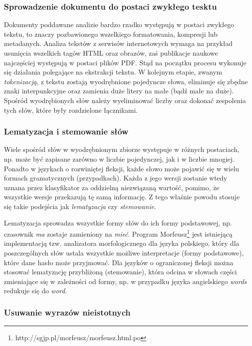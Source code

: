 \documentclass{pracamgr}
\begin{document}
\subsubsection{Sprowadzenie dokumentu do postaci zwykłego tesktu}

Dokumenty poddawane analizie bardzo rzadko występują w postaci zwykłego tekstu, to znaczy pozbawionego wszelkiego formatowania, kompresji lub metadanych. Analiza tekstów z serwisów internetowych wymaga na przykład usunięcia wszelkich tagów HTML oraz obrazów, zaś publikacje naukowe najczęściej występują w postaci plików PDF. Stąd na początku procesu wykonuje się działania polegające na ekstrakcji tekstu. W kolejnym etapie, zwanym \textit{tokenizacją}, z tekstu zostają wyodrębnione pojedyncze słowa, eliminuje się zbędne znaki interpunkcyjne oraz zamienia duże litery na małe (bądź małe na duże). Spośród wyodrębionych słów należy wyeliminować liczby oraz dokonać zespolenia tych słów, które były rozdzielone łącznikami.

\subsubsection{Lematyzacja i stemowanie słów}

Wiele spośród słów w wyodrębnionym zbiorze występuje w różnych postaciach, np. może być zapisane zarówno w liczbie pojedynczej, jak i w liczbie mnogiej. Ponadto w językach o rozwiniętej fleksji, każde słowo może pojawić się w wielu formach gramatycznych (przypadkach). Każda z jego wersji zostanie wtedy uznana przez klasyfikator za oddzielną niezwiązaną wartość, pomimo, że wszystkie wersje przekazują tę samą informację. Z tego właśnie powodu stosuje się takie podejścia jak \textit{lematyzacja} czy \textit{stemowanie}.

Lematyzacja sprowadza wszystkie formy słów do ich formy podstawowej, np. czasownik \textit{ma} zostaje zamieniony na \textit{mieć}. Program Morfeusz\footnote{http://sgjp.pl/morfeusz/morfeusz.html.po} jest istniejącą implementacją tzw. analizatora morfologicznego dla języka polskiego, który dla poszczególnych słów ustala wszystkie możliwe interpretacje (formy podstawowe), które dane hasło może przyjmować. Dla języków o ograniczonej fleksji można stosować lematyzację przybliżoną (stemowanie), która odcina w słowach części zmieniające się w zależności od formy, np. w przypadku języka angielskiego \textit{words} redukuje się do \textit{word}. 

\subsubsection{Usuwanie wyrazów nieistotnych}
\end{document}
